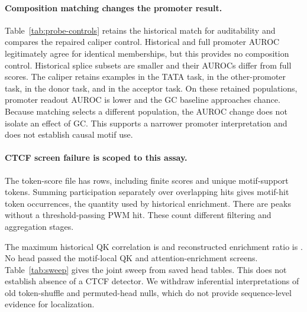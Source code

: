 \paragraph{Composition matching changes the promoter result.}
Table~\ref{tab:probe-controls} retains the historical match for auditability and compares the repaired caliper control. Historical and full promoter AUROC legitimately agree for identical memberships, but this provides no composition control. Historical splice subsets are smaller and their AUROCs differ from full scores. The caliper retains \CaliperTATACount{} examples in the TATA task, \CaliperOtherCount{} in the other-promoter task, \CaliperDonorCount{} in the donor task, and \CaliperAcceptorCount{} in the acceptor task. On these retained populations, promoter readout AUROC is lower and the GC baseline approaches chance. Because matching selects a different population, the AUROC change does not isolate an effect of GC. This supports a narrower promoter interpretation and does not establish causal motif use.
\begin{table}[t]
\centering\footnotesize\setlength{\tabcolsep}{3pt}
\caption{Readout AUROC and 95\% sequence-bootstrap intervals. Full, historical, and caliper populations differ; retained counts and composition diagnostics accompany the predictions.}
\label{tab:probe-controls}
\ControlTable
\end{table}

\paragraph{CTCF screen failure is scoped to this assay.}
The token-score file has \TokenRows{} rows, including \FiniteTokens{} finite scores and \UniqueSupport{} unique motif-support tokens. Summing participation separately over overlapping hits gives \HitOccurrences{} motif-hit token occurrences, the quantity used by historical enrichment. There are \AbsentSequences{} peaks without a threshold-passing PWM hit. These count different filtering and aggregation stages.

The maximum historical QK correlation is \BestQK{} and reconstructed enrichment ratio is \BestEnrichment{}. No head passed the motif-local QK and attention-enrichment screens. Table~\ref{tab:sweep} gives the joint sweep from saved head tables. This does not establish absence of a CTCF detector. We withdraw inferential interpretations of old token-shuffle and permuted-head nulls, which do not provide sequence-level evidence for localization.
\begin{table}[t]
\centering\small
\caption{Heads passing both descriptive cutoffs in the historical reconstructed-attention assay. No significance or confidence interval is assigned to a count of screened heads.}
\label{tab:sweep}
\ThresholdTable
\end{table}

